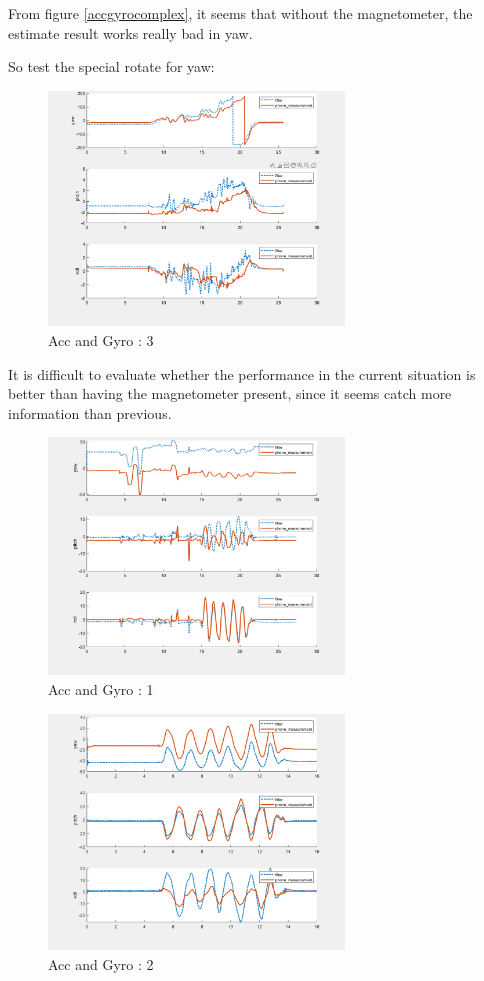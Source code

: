 From figure \ref{accgyrocomplex}, it seems that without the magnetometer, the estimate result works really bad in yaw.

So test the special rotate for yaw:

\begin{figure}[H]
 \centering
 \includegraphics[width=0.7\textwidth]{images/accgyro2.png}
 \caption{Acc and Gyro : 3}
\end{figure}

It is difficult to evaluate whether the performance in the current situation is better than having the magnetometer present, since it seems catch more information than previous.

\begin{figure}[H]
 \centering
 \includegraphics[width=0.7\textwidth]{images/accgyro1.png}
 \caption{Acc and Gyro : 1}
 \label{ag1}
\end{figure}


\begin{figure}[H]
 \centering
 \includegraphics[width=0.7\textwidth]{images/ag2.png}
 \caption{Acc and Gyro : 2}
 \label{ag2}
\end{figure}

